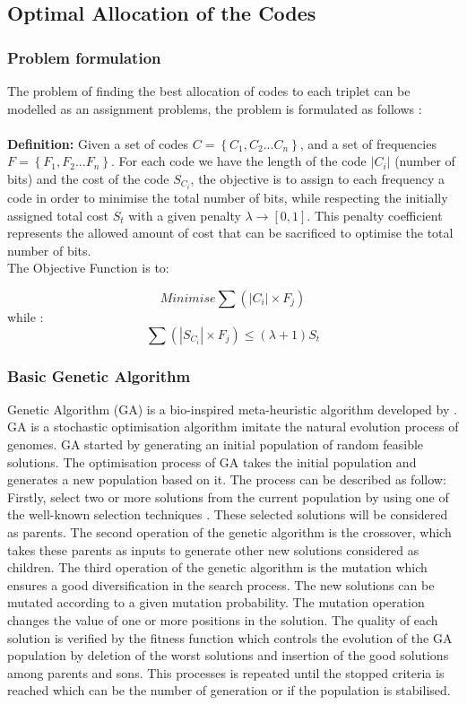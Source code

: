 \documentclass{singlecol-new}
\theoremstyle{TH}{
\newtheorem{lemma}{Lemma}
\newtheorem{theorem}[lemma]{Theorem}
\newtheorem{corrolary}[lemma]{Corrolary}
\newtheorem{conjecture}[lemma]{Conjecture}
\newtheorem{proposition}[lemma]{Proposition}
\newtheorem{claim}[lemma]{Claim}
\newtheorem{stheorem}[lemma]{Wrong Theorem}
}
\theoremstyle{THrm}{
\newtheorem{definition}{Definition}
\newtheorem{question}{Question}
\newtheorem{remark}{Remark}
\newtheorem{scheme}{Scheme}
}
\theoremstyle{THhit}{
\newtheorem{case}{Case}[section]
}
\begin{document}
\subsection{Optimal Allocation of the Codes}
\subsubsection{Problem formulation}
The problem of finding the best allocation of codes to each triplet can be   modelled as an assignment problems, the problem is formulated as follows :\\\\
\textbf{Definition:} Given a set of codes $C=\left\{C_{1},C_{2}...C_{n}\right\}$, and a set of frequencies $F=\left\{F_{1},F_{2}...F_{n}\right\}$. For each code we have the length of the code $|C_{i}|$ (number of bits) and the cost of the code $S_{C_{i}}$, the objective is to assign to each frequency a code in order to minimise the total number of bits, while respecting the initially assigned total cost $S_{t}$ with a given penalty $\lambda\rightarrow [0,1]$. This penalty coefficient represents the allowed amount of cost that can be sacrificed to optimise the total number of bits.    
\\
The Objective Function is to: 

\begin{equation}
Minimise \sum (|C_{i}| \times F_{j})
\end{equation}
while :
\begin{equation}
\sum (|S_{C_{i}}| \times F_{j}) \leqslant (\lambda+1) S_{t} 
\end{equation}

\subsubsection{Basic Genetic Algorithm}
Genetic Algorithm (GA) is a bio-inspired meta-heuristic algorithm developed by \citet{gen1}. GA is a stochastic optimisation algorithm imitate the natural evolution process of genomes. GA started by generating an initial population of random feasible solutions. The optimisation process of GA takes the initial population and generates a new population based on it.  The process can be described as follow:\\ 
Firstly, select two or more solutions from the current population by using one of the well-known selection techniques \citep{bli95}. These selected solutions will be considered as  parents. The second operation of the genetic algorithm is the crossover, which takes these parents as inputs to generate other new solutions considered as children. The third operation of the genetic algorithm is the mutation which ensures a good diversification in the search process. The new solutions can be mutated according to a given mutation probability. The mutation operation changes the value of one or more positions in the solution. The quality of each solution is verified by the fitness function which controls the evolution of the GA population by deletion of the worst solutions and insertion of the good solutions among  parents and sons. This processes is repeated until the stopped criteria is reached which can be the number of generation or if the population is stabilised.
\end{document}
